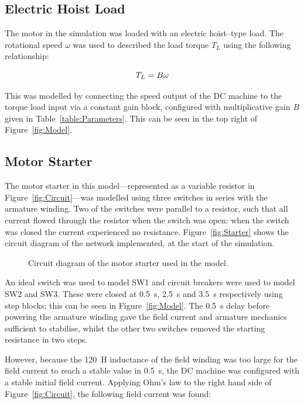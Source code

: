 \documentclass[a4paper,10pt]{article}
\newcommand{\s}{\si{\second}\xspace}
\renewcommand{\H}{\si{\henry}\xspace}
\begin{document}
\subsection{Electric Hoist Load}

The motor in the simulation was loaded with an electric hoist--type load. The 
rotational speed $\omega$ was used to described the load torque $T_L$ 
using the following relationship:

\begin{equation} \label{eq:B}
    T_L = B\omega \\
\end{equation}

This was modelled by connecting the speed output of the DC machine to the 
torque load input via a constant gain block, configured with multiplicative 
gain $B$ given in Table~\ref{table:Parameters}. This can be seen in the top 
right of Figure~\ref{fig:Model}.

\subsection{Motor Starter}

The motor starter in this model---represented as a variable resistor in 
Figure~\ref{fig:Circuit}---was modelled using three switches in series with the 
armature winding. Two of the switches were parallel to a resistor, such that 
all current flowed through the resistor when the switch was open: when the 
switch was closed the current experienced no resistance. 
Figure~\vref{fig:Starter} shows the circuit diagram of the network implemented, 
at the start of the simulation.

\begin{figure}[h]
    \centering
    \def\svgwidth{0.6\textwidth}
    
    \caption{Circuit diagram of the motor starter used in the model.}
    \label{fig:Starter}
\end{figure}

An ideal switch was used to model SW1 and circuit breakers were used to model 
SW2 and SW3. These were closed at 0.5~\s, 2.5~\s and 3.5~\s respectively using 
step blocks; this can be seen in Figure~\vref{fig:Model}. The 0.5~\s delay 
before powering the armature winding gave the field current and armature 
mechanics sufficient to stabilise, whilst the other two switches removed the 
starting resistance in two steps.

However, because the 120~\H inductance of the field winding was too large for 
the field current to reach a stable value in 0.5~\s, the DC machine was 
configured with a stable initial field current. Applying Ohm's law to the right 
hand side of Figure~\ref{fig:Circuit}, the following field current was found:
\end{document}

